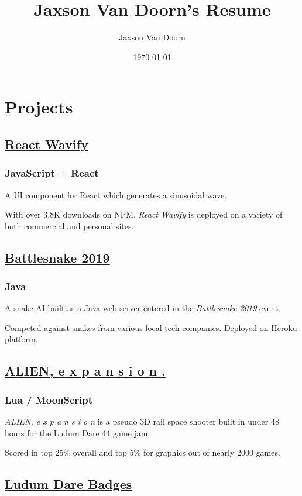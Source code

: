 \documentclass[letterpaper]{article}
\author{Jaxson Van Doorn}
\date{\today}
\title{Jaxson Van Doorn's Resume}
\begin{document}
 
\section{Projects}
\label{sec:org7cb7f5d}
\subsection{\href{https://github.com/woofers/react-wavify}{React Wavify}}
\label{sec:org676c849}
\subsubsection{JavaScript + React}
\label{sec:org1978cac}
A UI component for React which generates a sinusoidal wave.

With over 3.8K downloads on NPM, \emph{React Wavify} is deployed on a variety of both commercial and personal sites.
\subsection{\href{https://github.com/woofers/battlesnake-2019}{Battlesnake 2019}}
\label{sec:orgc81efa2}
\subsubsection{Java}
\label{sec:org556b818}
A snake AI built as a Java web-server entered in the \emph{Battlesnake 2019} event.

Competed against snakes from various local tech companies.  Deployed on Heroku platform.

\subsection{\href{https://github.com/woofers/ludum-dare-44}{ALIEN, e x p a n s i o n .}}
\label{sec:org5bd1707}
\subsubsection{Lua / MoonScript}
\label{sec:org70a3529}
\emph{ALIEN, e x p a n s i o n} is a pseudo 3D rail space shooter built in under 48 hours for the Ludum Dare 44 game jam.

Scored in top 25\% overall and top 5\% for graphics out of nearly 2000 games.

\subsection{\href{https://github.com/woofers/ludum-dare-badges}{Ludum Dare Badges}}
\label{sec:orgf4923f4}
\end{document}
